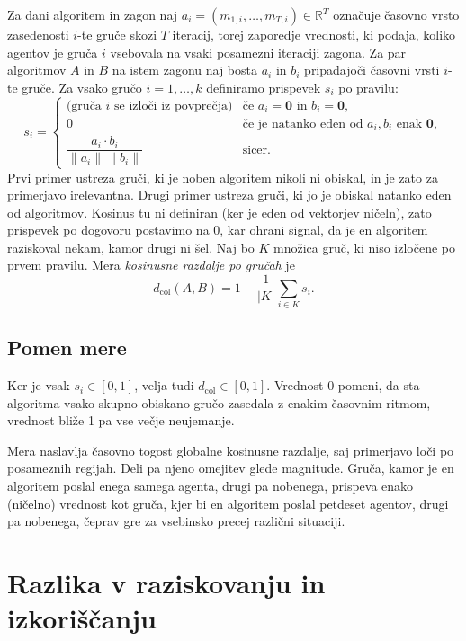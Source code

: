 \documentclass[a4paper, 12pt]{book}
\begin{document}
Za dani algoritem in zagon naj $a_i = (m_{1,i}, \dots, m_{T,i}) \in
\mathbb{R}^T$ označuje časovno vrsto zasedenosti $i$-te gruče skozi $T$ iteracij, torej zaporedje vrednosti, ki podaja, koliko agentov je gruča 
$i$ vsebovala na vsaki posamezni iteraciji zagona. Za par algoritmov $A$ in $B$ 
na istem zagonu naj bosta $a_i$ in $b_i$ pripadajoči časovni vrsti $i$-te gruče. 
Za vsako gručo $i = 1,\dots, k$ definiramo prispevek $s_i$ po pravilu:
\[
    s_i =
    \begin{cases}
        \text{(gruča $i$ se izloči iz povprečja)} & \text{če } a_i = \mathbf{0} \text{ in } b_i = \mathbf{0}, \\[4pt]
        0 & \text{če je natanko eden od } a_i, b_i \text{ enak } \mathbf{0}, \\[4pt]
        \dfrac{a_i \cdot b_i}{\lVert a_i \rVert \, \lVert b_i \rVert} & \text{sicer.}
    \end{cases}
\]
Prvi primer ustreza gruči, ki je noben algoritem nikoli ni obiskal, in je
zato za primerjavo irelevantna. Drugi primer ustreza gruči, ki jo je obiskal
natanko eden od algoritmov. Kosinus tu ni definiran (ker je eden od
vektorjev ničeln), zato prispevek po dogovoru postavimo na 0, kar ohrani
signal, da je en algoritem raziskoval nekam, kamor drugi ni šel. Naj bo
$K$ množica gruč, ki niso izločene po prvem pravilu. Mera \emph{kosinusne
razdalje po gručah} je
\[
    d_{\text{col}}(A, B) = 1 - \frac{1}{|K|} \sum_{i \in K} s_i.
\]

\subsection{Pomen mere}

Ker je vsak $s_i \in [0,1]$, velja tudi $d_{\text{col}} \in [0,1]$. Vrednost
0 pomeni, da sta algoritma vsako skupno obiskano gručo zasedala z enakim
časovnim ritmom, vrednost bliže 1 pa vse večje neujemanje.

Mera naslavlja časovno togost globalne kosinusne razdalje, saj primerjavo
loči po posameznih regijah. Deli pa njeno omejitev glede magnitude.
Gruča, kamor je en algoritem poslal enega samega agenta, drugi pa nobenega,
prispeva enako (ničelno) vrednost kot gruča, kjer bi en algoritem poslal
petdeset agentov, drugi pa nobenega, čeprav gre za vsebinsko precej
različni situaciji. 

\section{Razlika v raziskovanju in izkoriščanju}
\label{sec:exploration}
\end{document}
